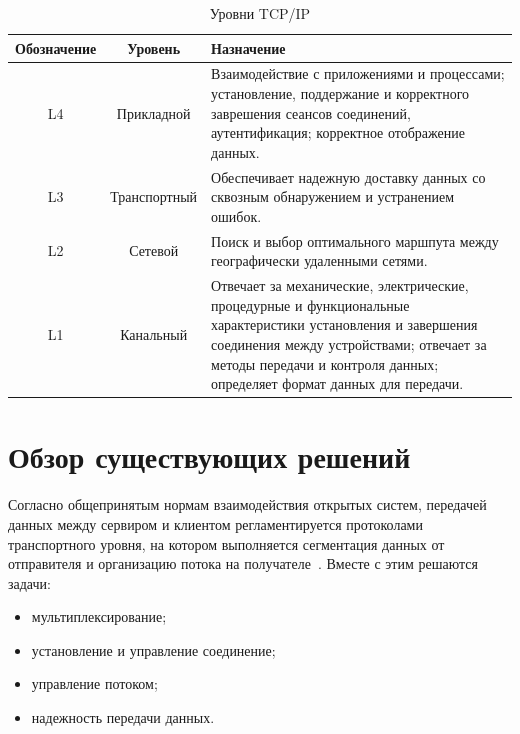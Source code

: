 \begin{table}[ht]
	\begin{center}
		\begin{threeparttable}
			\caption{\label{tab:tcp-ip} Уровни TCP/IP}
			\begin{tabular}{|c|c|>{\arraybackslash}p{9cm}|}
				\hline
				\textbf{Обозначение} & \textbf{Уровень} & \textbf{Назначение} \\ \hline
				L4  	& Прикладной   & Взаимодействие с приложениями и процессами; установление, поддержание и корректного заврешения сеансов соединений, аутентификация; корректное отображение данных. \\ \hline
				L3      & Транспортный &  Обеспечивает надежную доставку данных со сквозным обнаружением и устранением ошибок. \\ \hline
				L2  	& Сетевой	   & Поиск и выбор оптимального маршпута между географически удаленными сетями. \\ \hline
				L1    	& Канальный	   & Отвечает за механические, электрические, процедурные и функциональные характеристики установления и завершения соединения между устройствами; отвечает за методы передачи и контроля данных; определяет формат данных для передачи.\\ \hline
			\end{tabular}
		\end{threeparttable}
	\end{center}
\end{table}



\chapter{Обзор существующих решений}

Согласно общепринятым нормам взаимодействия открытых систем, передачей данных между сервиром и клиентом регламентируется протоколами транспортного уровня, на котором выполняется сегментация данных от отправителя и организацию потока на получателе~\cite{tcp_ip_reilly,  network_tanenbaum}. Вместе с этим решаются задачи:
\begin{itemize}
	\item мультиплексирование;
	\item установление и управление соединение;
	\item управление потоком;
	\item надежность передачи данных.
\end{itemize}

